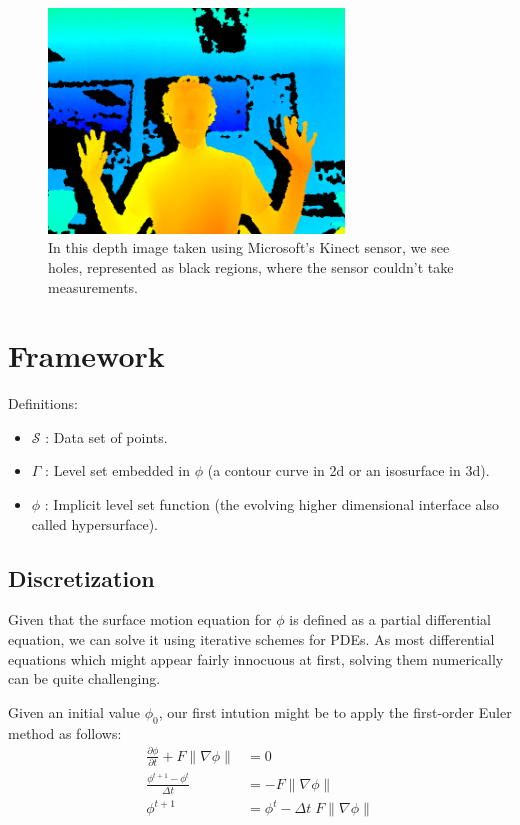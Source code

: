 \documentclass{article}
\begin{document}
\begin{figure}
  \centering
  \includegraphics[width=0.7\textwidth]{img/depthmap.png}
  \caption{In this depth image taken using Microsoft's Kinect sensor, we see
holes, represented as black regions, where the sensor couldn't take
measurements.}

\end{figure}


\section{Framework}

Definitions:
\begin{itemize}
\item $\mathcal{S}$ : Data set of points.
\item $\Gamma$ : Level set embedded in $\phi$ (a contour curve in 2d or an
    isosurface in 3d).
\item $\phi$ : Implicit level set function (the evolving higher dimensional
    interface also called hypersurface).
\end{itemize}

\subsection{Discretization}

Given that the surface motion equation for $\phi$ is defined as a partial
differential equation, we can solve it using iterative schemes for PDEs. As most
differential equations which might appear fairly innocuous at first, solving
them numerically can be quite challenging.

Given an initial value $\phi_0$, our first intution might be to apply the
first-order Euler method as follows:
\begin{align}
  \frac{\partial \phi}{\partial t} + F \|\nabla \phi\| &= 0 \\
  \frac{\phi^{t+1} - \phi^{t}}{\Delta t} &=  -F \|\nabla \phi\| \\
  \phi^{t+1} &= \phi^{t} - \Delta t \; F \|\nabla \phi\| 
\end{align}
\end{document}
